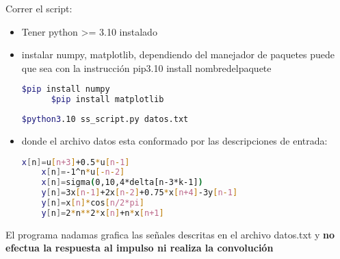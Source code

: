 \documentclass[11pt]{article}
\begin{document}
  Correr el script:
  \begin{itemize}
  \item Tener python >= 3.10 instalado
  \item instalar numpy, matplotlib, dependiendo del manejador de paquetes puede que sea con la instrucción pip3.10 install nombredelpaquete
    \begin{lstlisting}[language=Bash, caption=instalar dependencias]
      $pip install numpy
      $pip install matplotlib
  \end{lstlisting}
  \begin{lstlisting}[language=Bash, caption=Correr el programa]
    $python3.10 ss_script.py datos.txt
  \end{lstlisting}

  \item donde el archivo datos esta conformado por las descripciones de entrada:
  \begin{lstlisting}[language=Bash, caption=Archivo con datos]
    x[n]=u[n+3]+0.5*u[n-1]
    x[n]=-1^n*u[-n-2]
    x[n]=sigma(0,10,4*delta[n-3*k-1])
    y[n]=3x[n-1]+2x[n-2]+0.75*x[n+4]-3y[n-1]
    y[n]=x[n]*cos[n/2*pi]
    y[n]=2*n**2*x[n]+n*x[n+1]
  \end{lstlisting}
  \end{itemize}

  \begin{tcolorbox}[width=\textwidth,colback={red},title={**NOTA**},outer arc=0mm,colupper=white]    
    El programa nadamas grafica las señales descritas en el archivo datos.txt y \textbf{no efectua la respuesta al impulso ni realiza la convolución}  
  \end{tcolorbox}   


  
  \newpage

    
\end{document}
